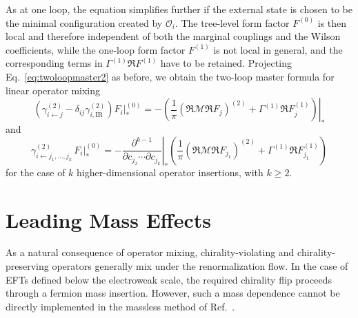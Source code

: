 As at one loop, the equation simplifies further if the external state is chosen to be the minimal
configuration created by $\mathcal O_i$.
The tree-level form factor $F^{(0)}$ is then local and
therefore independent of both the marginal couplings and the Wilson coefficients, while the one-loop form factor $F^{(1)}$ is not local in general, and
the corresponding terms in $\Gamma^{(1)}\Re F^{(1)}$ have to be retained.
Projecting
Eq.~\eqref{eq:twoloopmaster2} as before, we obtain the two-loop master formula for linear
operator mixing \cite{Bern:2020ikv}
\begin{equation}\label{eq:twoloopmasterlinear}
    \left(\gamma_{i\leftarrow j}^{(2)} - \delta_{ij}\gamma_{i,\text{IR}}^{(2)}\right)F_i|_*^{(0)}
    = -\left.\left(\frac{1}{\pi}(\Re \mathcal M\Re F_j)^{(2)}+\Gamma^{(1)}\Re F^{(1)}_j \right)\right|_{*}
\end{equation}
and
\begin{equation}
    \gamma_{i\leftarrow j_1,\dotsc,j_k}^{(2)}\, F_i|_*^{(0)}
    = -\left.\frac{\partial^{k-1}}{\partial c_{j_2} \dotsm \partial c_{j_k}}\right|_* \left(\frac{1}{\pi}(\Re \mathcal M\Re F_{j_1})^{(2)}+\Gamma^{(1)}\Re F^{(1)}_{j_1} \right)
\end{equation}
for the case of $k$ higher-dimensional operator insertions, with $k\ge 2$.

\section{Leading Mass Effects}
\label{sec:RGEmass}

As a natural consequence of operator mixing, chirality-violating and chirality-preserving operators generally mix under the renormalization flow.
In the case of EFTs defined below the electroweak scale, the required chirality flip proceeds through a fermion mass insertion. However, such a mass dependence cannot be directly implemented in the massless method of Ref.~\cite{Caron-Huot:2016cwu}. 

